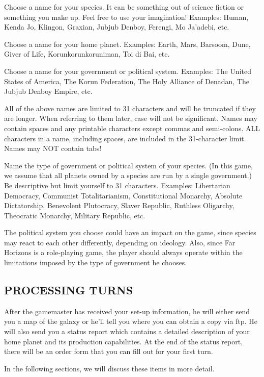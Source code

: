 \documentclass[10pt,titlepage]{article}
\begin{document}
Choose a name for your species.  It can be something out of science fiction or
something you make up.  Feel free to use your imagination!  Examples: Human,
Kenda Jo, Klingon, Graxian, Jubjub Denboy, Ferengi, Mo Ja'adebi, etc.

Choose a name for your home planet.  Examples: Earth, Mars, Barsoom, Dune,
Giver of Life, Korunkorunkoruniman, Toi di Bai, etc.

Choose a name for your government or political system.  Examples: The United
States of America, The Korun Federation, The Holy Alliance of Denadan, The
Jubjub Denboy Empire, etc.

All of the above names are limited to 31 characters and will be truncated if
they are longer.  When referring to them later, case will not be significant.
Names may contain spaces and any printable characters except commas and
semi-colons.  ALL characters in a name, including spaces, are included
in the 31-character limit.  Names may NOT contain tabs!

Name the type of government or political system of your species.  (In this
game, we assume that all planets owned by a species are run by a single
government.)  Be descriptive but limit yourself to 31 characters.  Examples:
Libertarian Democracy, Communist Totalitarianism, Constitutional Monarchy,
Absolute Dictatorship, Benevolent Plutocracy, Slaver Republic, Ruthless
Oligarchy, Theocratic Monarchy, Military Republic, etc.

The political system you choose could have an impact on the game, since species
may react to each other differently, depending on ideology.  Also, since Far
Horizons is a role-playing game, the player should always operate within the
limitations imposed by the type of government he chooses.


\subsection{PROCESSING TURNS}
\label{sec:processingturns}

After the gamemaster has received your set-up information, he will either send
you a map of the galaxy or he'll tell you where you can obtain a copy via ftp.
He will also send you a status report which contains a detailed description of
your home planet and its production capabilities.  At the end of the status
report, there will be an order form that you can fill out for your first turn.

In the following sections, we will discuss these items in more detail.
\end{document}
